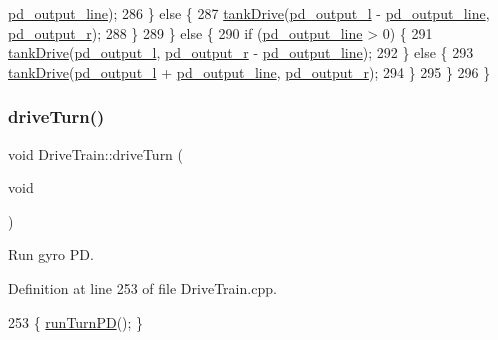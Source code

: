 \begin{DoxyCode}
      \hyperlink{class_drive_train_a02595614747de0602048d8d5e9643750}{pd\_output\_line});
286         \} \textcolor{keywordflow}{else} \{
287             \hyperlink{class_drive_train_a60ef155b4f149532a2ae872edc0e2cc2}{tankDrive}(\hyperlink{class_drive_train_a53268d36c28c3ed0e70aaf69086d4953}{pd\_output\_l} - \hyperlink{class_drive_train_a02595614747de0602048d8d5e9643750}{pd\_output\_line}, 
      \hyperlink{class_drive_train_a4c3242a549d04b72192e5cf9e590845e}{pd\_output\_r});
288         \}
289     \} \textcolor{keywordflow}{else} \{
290         \textcolor{keywordflow}{if} (\hyperlink{class_drive_train_a02595614747de0602048d8d5e9643750}{pd\_output\_line} > 0) \{
291             \hyperlink{class_drive_train_a60ef155b4f149532a2ae872edc0e2cc2}{tankDrive}(\hyperlink{class_drive_train_a53268d36c28c3ed0e70aaf69086d4953}{pd\_output\_l}, \hyperlink{class_drive_train_a4c3242a549d04b72192e5cf9e590845e}{pd\_output\_r} - 
      \hyperlink{class_drive_train_a02595614747de0602048d8d5e9643750}{pd\_output\_line});
292         \} \textcolor{keywordflow}{else} \{
293             \hyperlink{class_drive_train_a60ef155b4f149532a2ae872edc0e2cc2}{tankDrive}(\hyperlink{class_drive_train_a53268d36c28c3ed0e70aaf69086d4953}{pd\_output\_l} + \hyperlink{class_drive_train_a02595614747de0602048d8d5e9643750}{pd\_output\_line}, 
      \hyperlink{class_drive_train_a4c3242a549d04b72192e5cf9e590845e}{pd\_output\_r});
294         \}
295     \}
296 \}
\end{DoxyCode}
\mbox{\label{class_drive_train_af7e515735f07964fdf42e79bf822e3d1}} 
\subsubsection{\texorpdfstring{drive\+Turn()}{driveTurn()}}
{\footnotesize\ttfamily void Drive\+Train\+::drive\+Turn (\begin{DoxyParamCaption}\item[{void}]{ }\end{DoxyParamCaption})}



Run gyro PD. 



Definition at line 253 of file Drive\+Train.\+cpp.


\begin{DoxyCode}
253 \{ \hyperlink{class_drive_train_abbd159972d9f4dd6fa0dd0f398a498dc}{runTurnPD}(); \}
\end{DoxyCode}
\mbox{\label{class_drive_train_acc0d2f2280bfacea903df5d77ee1c5e0}} 
